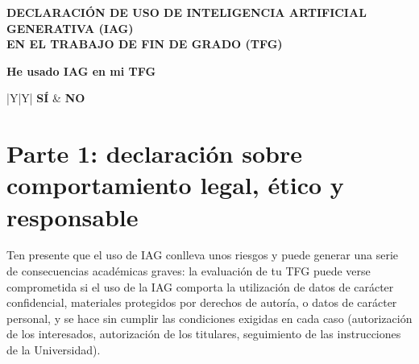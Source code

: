 %

\newcommand{\casilla}{\makebox[1.4em][l]{$\square$}}
\newcommand{\casillam}{%
  \makebox[1.4em][l]{\rlap{$\square$}\hspace{0.17em}\raisebox{0.15ex}{\scriptsize$\checkmark$}}}
\newcommand{\anchopleno}{\dimexpr\linewidth-2\tabcolsep-2\arrayrulewidth\relax}


\begin{center}
  \textbf{\large DECLARACIÓN DE USO DE INTELIGENCIA ARTIFICIAL GENERATIVA (IAG)\\
  EN EL TRABAJO DE FIN DE GRADO (TFG)}
\end{center}

\bigskip

\noindent\textbf{He usado IAG en mi TFG}


\smallskip

\noindent\begin{tabularx}{\linewidth}{|Y|Y|}
\hline
\casillam\textbf{SÍ} & \casilla\textbf{NO} \\
\hline
\end{tabularx}


\section*{Parte 1: declaración sobre comportamiento legal, ético y responsable}

Ten presente que el uso de IAG conlleva unos riesgos y puede generar una serie de
consecuencias académicas graves: la evaluación de tu TFG puede verse comprometida si
el uso de la IAG comporta la utilización de datos de carácter confidencial, materiales
protegidos por derechos de autoría, o datos de carácter personal, y se hace sin cumplir
las condiciones exigidas en cada caso (autorización de los interesados, autorización de
los titulares, seguimiento de las instrucciones de la Universidad).

